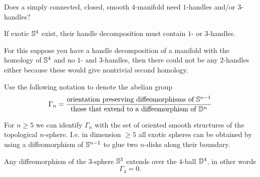 \begin{openquestion*}[\textcolor{olive}{(Still open?)}]
	Does a simply connected, closed, smooth $4$-manifold need
	$1$-handles and/or $3$-handles?
\end{openquestion*}

\begin{observation}
	If exotic $\mathbb{S}^{4}$ exist, their handle decomposition must
	contain $1$- or $3$-handles.
	
	For this suppose you have a handle decomposition of a manifold
	with the homology of $\mathbb{S}^{4}$ and no $1$- and $3$-handles,
	then there could not be any $2$-handles either because these would
	give nontrivial second homology. 
\end{observation}

\begin{definition}
	Use the following notation to denote the abelian group
	\begin{equation*}
		\Gamma_n = 
		\frac{\textrm{orientation preserving diffeomorphisms of } \mathbb{S}^{n-1}}
			 {\textrm{those that extend to a diffeomorphism of } \mathbb{D}^{n}}
	\end{equation*}
\end{definition}

\begin{proposition}
	For $n \ge 5$ we can identify $\Gamma_{n}$
	with the set of oriented smooth structures
	of the topological $n$-sphere.
	I.e. in dimension $\ge 5$ all exotic spheres
	can be obtained by using a diffeomorphism of
	$\mathbb{S}^{n-1}$ to glue two $n$-disks along their boundary.
\end{proposition}

\begin{theorem}
	Any diffeomorphism of the $3$-sphere $\mathbb{S}^{3}$
	extends over the $4$-ball $\mathbb{D}^{4}$,
	in other words
	\[
		\Gamma_4 = 0.
	\]
\end{theorem}

